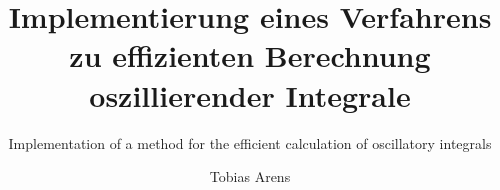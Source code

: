 \documentclass[envcountsame, envcountchap, deutsch]{i-studis}
\begin{document}
\title{Implementierung eines Verfahrens zu effizienten Berechnung oszillierender Integrale}
\subtitle{Implementation of a method for the efficient calculation of oscillatory integrals}

\author{Tobias Arens}


\address{Mehren}


\mytitlepage

\frontmatter
\tableofcontents										%
\listoffigures											%
\listoftables											%
\lstlistoflistings										%


\mainmatter








\backmatter
\printbibliography
\printindex												%


\begin{appendix}
\end{appendix}
\end{document}
